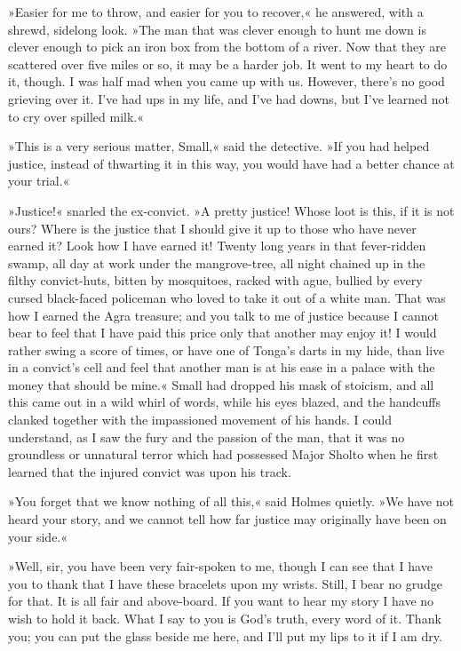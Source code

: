 »Easier for me to throw, and easier for you to recover,« he answered, with a shrewd, sidelong look. »The man that was clever enough to hunt me down is clever enough to pick an iron box from the bottom of a river. Now that they are scattered over five miles or so, it may be a harder job. It went to my heart to do it, though. I was half mad when you came up with us. However, there's no good grieving over it. I've had ups in my life, and I've had downs, but I've learned not to cry over spilled milk.«

»This is a very serious matter, Small,« said the detective. »If you had helped justice, instead of thwarting it in this way, you would have had a better chance at your trial.«

»Justice!« snarled the ex-convict. »A pretty justice! Whose loot is this, if it is not ours? Where is the justice that I should give it up to those who have never earned it? Look how I have earned it! Twenty long years in that fever-ridden swamp, all day at work under the mangrove-tree, all night chained up in the filthy convict-huts, bitten by mosquitoes, racked with ague, bullied by every cursed black-faced policeman who loved to take it out of a white man. That was how I earned the Agra treasure; and you talk to me of justice because I cannot bear to feel that I have paid this price only that another may enjoy it! I would rather swing a score of times, or have one of Tonga's darts in my hide, than live in a convict's cell and feel that another man is at his ease in a palace with the money that should be mine.« Small had dropped his mask of stoicism, and all this came out in a wild whirl of words, while his eyes blazed, and the handcuffs clanked together with the impassioned movement of his hands. I could understand, as I saw the fury and the passion of the man, that it was no groundless or unnatural terror which had possessed Major Sholto when he first learned that the injured convict was upon his track.

»You forget that we know nothing of all this,« said Holmes quietly. »We have not heard your story, and we cannot tell how far justice may originally have been on your side.«

»Well, sir, you have been very fair-spoken to me, though I can see that I have you to thank that I have these bracelets upon my wrists. Still, I bear no grudge for that. It is all fair and above-board. If you want to hear my story I have no wish to hold it back. What I say to you is God's truth, every word of it. Thank you; you can put the glass beside me here, and I'll put my lips to it if I am dry.

